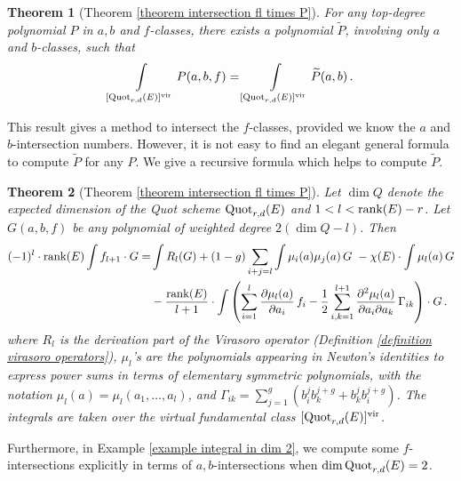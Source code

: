\documentclass[11pt]{amsart}
\newtheorem*{theorem*}{Theorem}
\theoremstyle{remark}
\newcommand{\p}{\partial}
\newcommand{\rk}{\textnormal{rank}}
\newcommand{\wt}[1]{\widetilde{#1}}
\newcommand{\quot}[0]{\textnormal{Quot}}
\newcommand{\vir}[0]{\textnormal{vir}}
\numberwithin{theorem}{section}
\begin{document}
\begin{theorem*}[Theorem \ref{theorem intersection fl times P}]
    For any top-degree polynomial $P$ in $a,b$ and $f$-classes, 
    there exists a polynomial $\wt P$, involving only $a$ and $b$-classes,
    such that
    $$ \int\limits_{[\quot_{r,d}(E)]^\vir} P(a,b,f) = \int\limits_{[\quot_{r,d}(E)]^\vir} \wt P(a,b)\,.$$
\end{theorem*}
    This result gives a method to intersect the $f$-classes,
    provided we know the $a$ and $b$-intersection numbers.
    However, it is not easy to find an elegant general formula to compute $\wt P$ for any $P$.
    We give a recursive formula which helps to compute $\wt P$.
    \begin{theorem*}[Theorem \ref{theorem intersection fl times P}]
    Let $\dim Q$ denote the expected dimension of the Quot scheme
    $\quot_{r,d}(E)$ and $1 < l < \rk(E)-r$.
    Let $G(a,b,f)$ be any polynomial 
    of weighted degree $2(\dim Q - l)$.
    Then 
    \begin{align*}
    \nonumber
        (-1)^{l} \cdot \rk(E) \int f_{l+1} \cdot G = &\int R_l(G) + 
        (1-g) \sum_{i+j=l} \int \mu_i(a) \mu_j(a) \, G 
        \ - \chi(E) \cdot \int \mu_l(a)\, G \\
        & - \frac{\rk(E)}{l+1} \cdot \int \left(
        \sum_{i=1}^{l} \frac{\p \mu_l(a)}{\p a_i} \, f_i 
        - \frac{1}{2} \sum_{i,k=1}^{l+1} \frac{\p^2 \mu_l(a)}{\p a_i \p a_k} \, \Gamma_{ik}
        \right) \cdot G \,.
    \end{align*}
    where $R_l$ is the derivation part of the Virasoro operator (Definition \ref{definition virasoro operators}),
    $\mu_l$'s are the polynomials appearing in Newton’s identities to express power sums in terms of elementary symmetric polynomials, with the notation $\mu_l(a)=\mu_l(a_1,\dots,a_l)$,
    and $\Gamma_{ik} = \sum_{j=1}^g (b_i^j b_k^{j+g} + b_k^j b_i^{j+g})$.
    The integrals are taken over the virtual fundamental class $[\quot_{r,d}(E)]^\vir$.
    \end{theorem*}
    Furthermore, in Example \ref{example integral in dim 2}, 
    we compute some $f$-intersections explicitly in terms of $a,b$-intersections when $\dim \quot_{r,d}(E) =2$.
\end{document}
